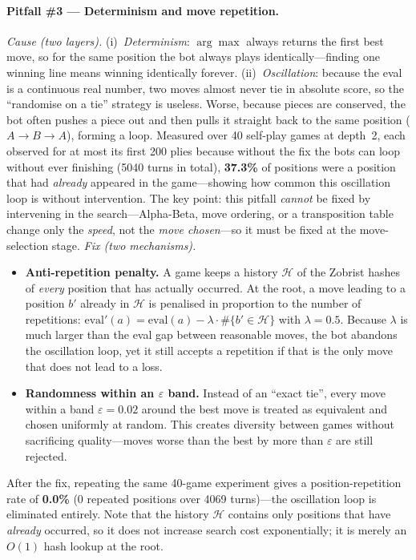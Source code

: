 \paragraph{Pitfall \#3 --- Determinism and move repetition.}
\emph{Cause (two layers).} (i)~\emph{Determinism}: $\arg\max$ always
returns the first best move, so for the same position the bot always plays
identically---finding one winning line means winning identically forever.
(ii)~\emph{Oscillation}: because the eval is a continuous real number, two
moves almost never tie in absolute score, so the ``randomise on a tie''
strategy is useless. Worse, because pieces are conserved, the bot often
pushes a piece out and then pulls it straight back to the same position
($A\!\to\!B\!\to\!A$), forming a loop. Measured over 40 self-play games at
depth~2, each observed for at most its first 200 plies because without the
fix the bots can loop without ever finishing (5040 turns in total), \textbf{37.3\%} of positions were a position
that had \emph{already} appeared in the game---showing how common this
oscillation loop is without intervention. The key point: this pitfall
\emph{cannot} be fixed by intervening in the search---Alpha-Beta, move
ordering, or a transposition table change only the \emph{speed}, not the
\emph{move chosen}---so it must be fixed at the move-selection stage.
\emph{Fix (two mechanisms).}
\begin{itemize}
  \item \textbf{Anti-repetition penalty.} A game keeps a history
        $\mathcal H$ of the Zobrist hashes of \emph{every} position that
        has actually occurred. At the root, a move leading to a position
        $b'$ already in $\mathcal H$ is penalised in proportion to the
        number of repetitions:
        $\mathrm{eval}'(a)=\mathrm{eval}(a)-\lambda\cdot\#\{b'\in\mathcal
        H\}$ with $\lambda=0.5$. Because $\lambda$ is much larger than the
        eval gap between reasonable moves, the bot abandons the
        oscillation loop, yet it still accepts a repetition if that is the
        only move that does not lead to a loss.
  \item \textbf{Randomness within an $\varepsilon$ band.} Instead of an
        ``exact tie'', every move within a band $\varepsilon=0.02$ around
        the best move is treated as equivalent and chosen uniformly at
        random. This creates diversity between games without sacrificing
        quality---moves worse than the best by more than $\varepsilon$ are
        still rejected.
\end{itemize}
After the fix, repeating the same 40-game experiment gives a
position-repetition rate of \textbf{0.0\%} (0 repeated positions over 4069
turns)---the oscillation loop is eliminated entirely. Note that the history
$\mathcal H$ contains only positions that have \emph{already} occurred, so
it does not increase search cost exponentially; it is merely an $O(1)$ hash
lookup at the root.
